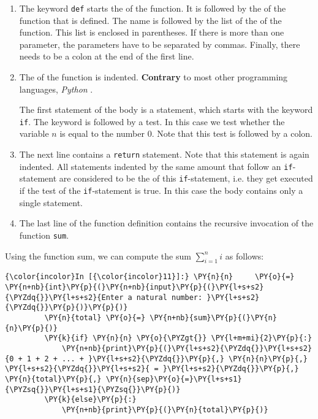 \begin{enumerate}
\item The keyword \texttt{def} starts the  of the function. It is followed by the  of the function that is defined.  The name is followed by the list of the  of the function.  This list is enclosed in parentheses. If there is more than one parameter, the parameters have to be separated by commas.  Finally, there needs to be a colon at the end of the first line.
\item The  of the function is indented.   \textbf{Contrary} to most other programming languages, 
     \textsl{Python} .
    
     The first statement of the body is a  statement, which starts with the keyword
     \texttt{if}.  The keyword is followed by a test.  In this case we test whether the variable $n$ 
     is equal to the number $0$.  Note that this test is followed by a colon.
\item The next line contains a \texttt{return} statement.  Note that this statement is again indented.
     All statements indented by the same amount that follow an \texttt{if}-statement are considered to be
     the  of this \texttt{if}-statement, i.e. they get executed if the test of the
     \texttt{if}-statement is true.  In this case the body contains only a single statement.

\item The last line of the function definition contains the recursive invocation of the function \texttt{sum}.
\end{enumerate}
Using the function sum, we can compute the sum \(\sum\limits_{i=1}^n i\)
as follows:
\begin{Verbatim}[commandchars=\\\{\}]
{\color{incolor}In [{\color{incolor}11}]:} \PY{n}{n}     \PY{o}{=} \PY{n+nb}{int}\PY{p}{(}\PY{n+nb}{input}\PY{p}{(}\PY{l+s+s2}{\PYZdq{}}\PY{l+s+s2}{Enter a natural number: }\PY{l+s+s2}{\PYZdq{}}\PY{p}{)}\PY{p}{)}
         \PY{n}{total} \PY{o}{=} \PY{n+nb}{sum}\PY{p}{(}\PY{n}{n}\PY{p}{)}
         \PY{k}{if} \PY{n}{n} \PY{o}{\PYZgt{}} \PY{l+m+mi}{2}\PY{p}{:}
             \PY{n+nb}{print}\PY{p}{(}\PY{l+s+s2}{\PYZdq{}}\PY{l+s+s2}{0 + 1 + 2 + ... + }\PY{l+s+s2}{\PYZdq{}}\PY{p}{,} \PY{n}{n}\PY{p}{,} \PY{l+s+s2}{\PYZdq{}}\PY{l+s+s2}{ = }\PY{l+s+s2}{\PYZdq{}}\PY{p}{,} \PY{n}{total}\PY{p}{,} \PY{n}{sep}\PY{o}{=}\PY{l+s+s1}{\PYZsq{}}\PY{l+s+s1}{\PYZsq{}}\PY{p}{)}
         \PY{k}{else}\PY{p}{:} 
             \PY{n+nb}{print}\PY{p}{(}\PY{n}{total}\PY{p}{)}
\end{Verbatim}



